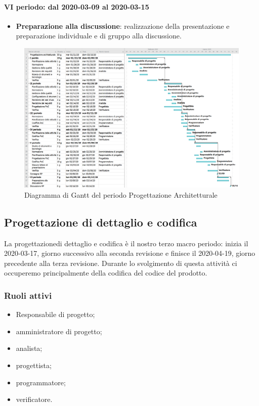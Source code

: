 \paragraph*{VI periodo: dal 2020-03-09 al 2020-03-15}
\begin{itemize}
	\item \textbf{Preparazione alla discussione}: realizzazione della presentazione e preparazione individuale e di gruppo alla discussione.
\end{itemize}

\begin{landscape}
	\begin{figure}
		\centering
		\includegraphics[scale=0.512]{./gantt/Progettazione architetturale.png}
		\caption{Diagramma di Gantt del periodo Progettazione Architetturale}
	\end{figure}
\end{landscape}
\pagebreak


\subsection{Progettazione di dettaglio e codifica}
La progettazione\glosp di dettaglio e codifica è il nostro terzo macro periodo: inizia il 2020-03-17, giorno successivo alla seconda revisione e finisce il 2020-04-19, giorno precedente alla terza revisione. Durante lo svolgimento di questa attività ci occuperemo principalmente della codifica del codice del prodotto\glo.

\subsubsection{Ruoli attivi}
\begin{itemize}
	\item Responsabile di progetto\glo;
	\item amministratore di progetto\glo;
	\item analista;
	\item progettista;
	\item programmatore;
	\item verificatore.
\end{itemize}

